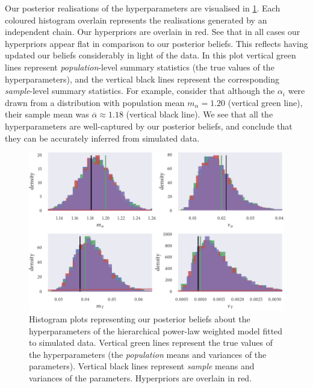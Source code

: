 Our posterior realisations of the hyperparameters are visualised in
\cref{fig:power_hier_hist}. Each coloured histogram overlain represents the
realisations generated by an independent chain. Our hyperpriors are overlain in
red. See that in all cases our hyperpriors appear flat in comparison to our
posterior beliefs. This reflects having updated our beliefs considerably in
light of the data. In this plot vertical green lines represent
\emph{population}-level summary statistics (the true values of the
hyperparameters), and the vertical black lines represent the corresponding
\emph{sample}-level summary statistics. For example, consider that although the
$\alpha_i$ were drawn from a distribution with population mean
$m_{\alpha}=1.20$ (vertical green line), their sample mean was
$\overline{\alpha}\approx1.18$ (vertical black line). We see that all the
hyperparameters are well-captured by our posterior beliefs, and conclude that
they can be accurately inferred from simulated data.

\begin{figure}[tbp]
  \includegraphics{power_hier_hist.pdf}
  \caption{Histogram plots representing our posterior beliefs about the
    hyperparameters of the hierarchical power-law weighted model fitted to
    simulated data. Vertical green lines represent the true values of the
    hyperparameters (the \emph{population} means and variances of the
    parameters). Vertical black lines represent \emph{sample} means and
    variances of the parameters. Hyperpriors are overlain in red.}
  \label{fig:power_hier_hist}
\end{figure}

